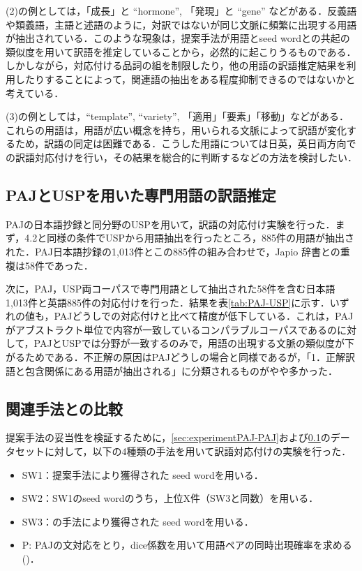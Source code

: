 \documentclass[japanese]{jnlp_1.3e}
\begin{document}
(2)の例としては，「成長」と ``hormone'', 「発現」と ``gene'' などがある．反義語や類義語，主語と述語のように，対訳ではないが同じ文脈に頻繁に出現する用語が抽出されている．このような現象は，提案手法が用語とseed wordとの共起の類似度を用いて訳語を推定していることから，必然的に起こりうるものである．しかしながら，対応付ける品詞の組を制限したり，他の用語の訳語推定結果を利用したりすることによって，関連語の抽出をある程度抑制できるのではないかと考えている．

(3)の例としては，``template'', ``variety'', 「適用」「要素」「移動」などがある．これらの用語は，用語が広い概念を持ち，用いられる文脈によって訳語が変化するため，訳語の同定は困難である．こうした用語については日英，英日両方向での訳語対応付けを行い，その結果を総合的に判断するなどの方法を検討したい．

\subsection{PAJとUSPを用いた専門用語の訳語推定}
\label{sec:experimentPAJ-USP}

PAJの日本語抄録と同分野のUSPを用いて，訳語の対応付け実験を行った．まず，4.2と同様の条件でUSPから用語抽出を行ったところ，885件の用語が抽出された．PAJ日本語抄録の1,013件とこの885件の組み合わせで，Japio 辞書との重複は58件であった．

次に，PAJ，USP両コーパスで専門用語として抽出された58件を含む日本語1,013件と英語885件の対応付けを行った．結果を表\ref{tab:PAJ-USP}に示す．いずれの値も，PAJどうしでの対応付けと比べて精度が低下している．これは，PAJがアブストラクト単位で内容が一致しているコンパラブルコーパスであるのに対して，PAJとUSPでは分野が一致するのみで，用語の出現する文脈の類似度が下がるためである．不正解の原因はPAJどうしの場合と同様であるが，「1．正解訳語と包含関係にある用語が抽出される」に分類されるものがやや多かった．

\begin{table}[b]

\end{table}

\subsection{関連手法との比較}

提案手法の妥当性を検証するために，\ref{sec:experimentPAJ-PAJ}および\ref{sec:experimentPAJ-USP}のデータセットに対して，以下の4種類の手法を用いて訳語対応付けの実験を行った． 

\begin{itemize}
\item SW1：提案手法により獲得された seed wordを用いる．
\item SW2：SW1のseed wordのうち，上位X件（SW3と同数）を用いる．
\item SW3：\cite{Fung_and_McKeown97}の手法により獲得された seed wordを用いる．
\item P: PAJの文対応をとり，dice係数を用いて用語ペアの同時出現確率を求める(\cite{Smadja96})．
\end{itemize}
\end{document}
